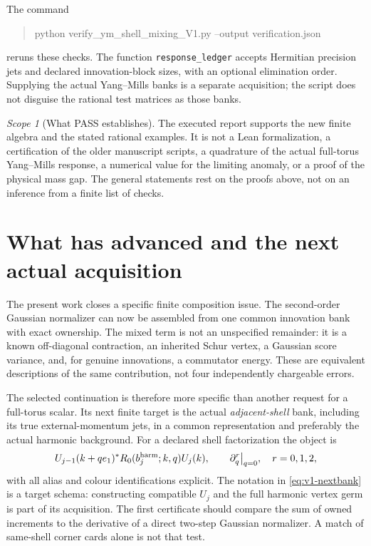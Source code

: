 \documentclass[11pt,a4paper]{article}
\theoremstyle{definition}
\theoremstyle{remark}
\newtheorem{scope}[scope]{Scope}
\begin{document}
The command
\begin{quote}\small\ttfamily
python verify\_ym\_shell\_mixing\_V1.py --output verification.json
\end{quote}
reruns these checks. The function \texttt{response\_ledger} accepts
Hermitian precision jets and declared innovation-block sizes, with an
optional elimination order. Supplying the actual Yang--Mills banks is a
separate acquisition; the script does not disguise the rational test
matrices as those banks.

\begin{scope}[What PASS establishes]
The executed report supports the new finite algebra and the stated
rational examples. It is not a Lean formalization, a certification of
the older manuscript scripts, a quadrature of the actual full-torus
Yang--Mills response, a numerical value for the limiting anomaly, or a
proof of the physical mass gap. The general statements rest on the
proofs above, not on an inference from a finite list of checks.
\end{scope}

\section{What has advanced and the next actual acquisition}
\label{sec:v1-next}

The present work closes a specific finite composition issue. The
second-order Gaussian normalizer can now be assembled from one common
innovation bank with exact ownership. The mixed term is not an
unspecified remainder: it is a known off-diagonal contraction, an
inherited Schur vertex, a Gaussian score variance, and, for genuine
innovations, a commutator energy. These are equivalent descriptions of
the same contribution, not four independently chargeable errors.

The selected continuation is therefore more specific than another
request for a full-torus scalar. Its next finite target is the actual
\emph{adjacent-shell} bank, including its true external-momentum jets,
in a common representation and preferably the actual harmonic
background. For a declared shell factorization the object is
\begin{equation}\label{eq:v1-nextbank}
 U_{j-1}(k+qe_1)^*R_0(b_j^{\rm harm};k,q)U_j(k),
 \qquad \partial_q^r\big|_{q=0},\quad r=0,1,2,
\end{equation}
with all alias and colour identifications explicit. The notation in
\cref{eq:v1-nextbank} is a target schema: constructing compatible
$U_j$ and the full harmonic vertex germ is part of its acquisition.
The first certificate should compare the sum of owned increments to
the derivative of a direct two-step Gaussian normalizer. A match of
same-shell corner cards alone is not that test.
\end{document}
